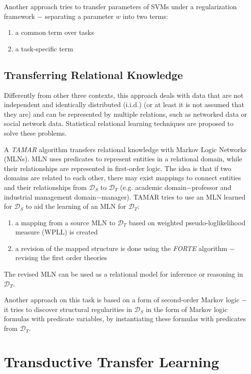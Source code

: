 \documentclass[a4paper,twocolumn]{article}
\newcommand{\D}{\mathcal{D}}
\begin{document}
Another approach tries to transfer parameters of SVMs under a regularization framework $-$ separating a parameter $w$ into two terms:
\begin{enumerate}
    \item a common term over tasks
    \item a task-specific term
\end{enumerate}

\subsection{Transferring Relational Knowledge}
Differently from other three contexts, this approach deals with data that are not independent and identically distributed (i.i.d.) (or at least it is not assumed that they are) and can be represented by multiple relations, such as networked data or social network data. Statistical relational learning techniques are proposed to solve these problems.

A \textit{TAMAR} algorithm transfers relational knowledge with Markov Logic Networks (MLNs). MLN uses predicates to represent entities in a relational domain, while their relationships are represented in first-order logic. The idea is that if two domains are related to each other, there may exist mappings to connect entities and their relationships from $\D_S$ to $\D_T$ (e.g. academic domain$-$professor and industrial management domain$-$manager). TAMAR tries to use an MLN learned for $\D_S$ to aid the learning of an MLN for $\D_T$:
\begin{enumerate}
    \item a mapping from a source MLN to $\D_T$ based on weighted pseudo-loglikelihood measure (WPLL) is created
    \item a revision of the mapped structure is done using the \textit{FORTE} algorithm $-$ revising the first order theories
\end{enumerate}
The revised MLN can be used as a relational model for inference or reasoning in $\D_T$.

Another approach on this task is based on a form of second-order Markov logic $-$ it tries to discover structural regularities in $\D_S$ in the form of Markov logic formulas with predicate variables, by instantiating these formulas with predicates from $\D_T$.

\section{Transductive Transfer Learning}
\end{document}
